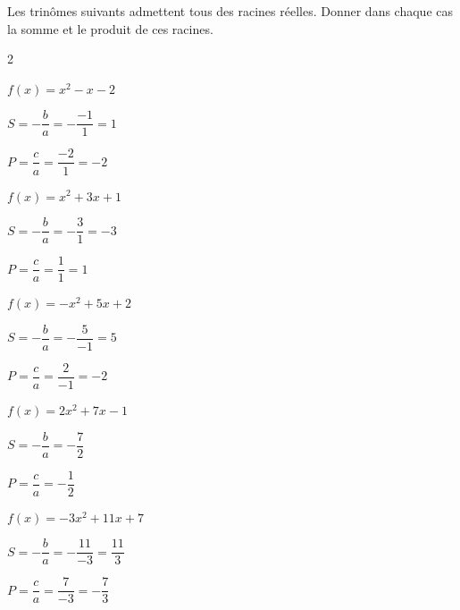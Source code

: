 \documentclass[11pt,a4paper]{article}  %
\begin{document}
Les trinômes suivants admettent tous des racines réelles. Donner dans chaque cas la somme et le produit de ces racines.
\begin{multicols}{2}
\begin{enumMet}
	\item $f(x)=x^2-x-2$
	\begin{corrBox}
		\begin{itemMet}
			\item \( S = -\dfrac{b}{a} = -\dfrac{-1}{1}= 1 \)
			\item \( P = \dfrac{c}{a} = \dfrac{-2}{1} = -2 \)
		\end{itemMet}
	\end{corrBox}
	\item $f(x)=x^2+3 x+1$
	\begin{corrBox}
		\begin{itemMet}
			\item \( S = -\dfrac{b}{a} = -\dfrac{3}{1} = -3 \)
			\item \( P = \dfrac{c}{a} = \dfrac{1}{1} = 1 \)
		\end{itemMet}
	\end{corrBox}
	\item $f(x)=-x^2+5 x+2$
	\begin{corrBox}
		\begin{itemMet}
			\item \( S = -\dfrac{b}{a} = -\dfrac{5}{-1} = 5 \)
			\item \( P = \dfrac{c}{a} = \dfrac{2}{-1} = -2 \)
		\end{itemMet}
	\end{corrBox}
	\item $f(x)=2 x^2+7 x-1$
	\begin{corrBox}
		\begin{itemMet}
			\item \( S = -\dfrac{b}{a} = -\dfrac{7}{2} \)
			\item \( P = \dfrac{c}{a} = -\dfrac{1}{2} \)
		\end{itemMet}
	\end{corrBox}
	\item $f(x)=-3 x^2+11 x+7$
	\begin{corrBox}
		\begin{itemMet}
			\item \( S = -\dfrac{b}{a} = -\dfrac{11}{-3}=\dfrac{11}{3} \)
			\item \( P = \dfrac{c}{a} = \dfrac{7}{-3}=-\dfrac{7}{3} \)
		\end{itemMet}

\end{corrBox}
\end{enumMet}
\end{multicols}
\end{document}
